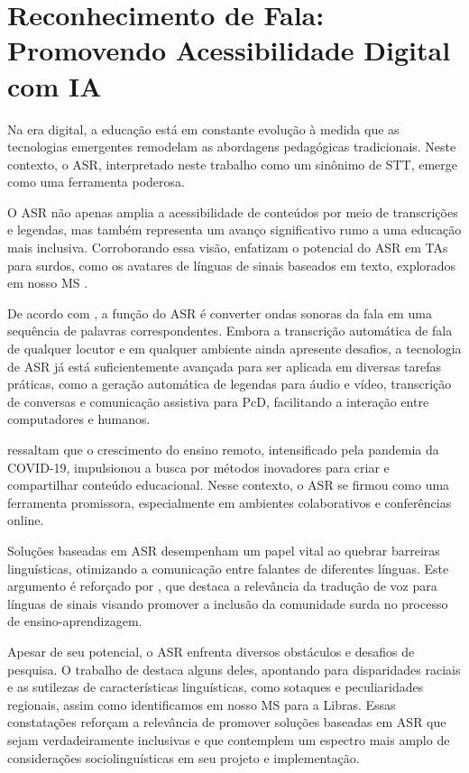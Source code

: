 \section{Reconhecimento de Fala: Promovendo Acessibilidade Digital com IA}
\label{section:foundation:asr}

Na era digital, a educação está em constante evolução à medida que as tecnologias emergentes remodelam as abordagens pedagógicas tradicionais. Neste contexto, o ASR, interpretado neste trabalho como um sinônimo de STT, emerge como uma ferramenta poderosa.

O ASR não apenas amplia a acessibilidade de conteúdos por meio de transcrições e legendas, mas também representa um avanço significativo rumo a uma educação mais inclusiva. Corroborando essa visão,  enfatizam o potencial do ASR em TAs para surdos, como os avatares de línguas de sinais baseados em texto, explorados em nosso MS \cite{FalvoJr2020_FIE, FalvoJr2020_SBIE, FalvoJr2021_RENOTE}.

De acordo com , a função do ASR é converter ondas sonoras da fala em uma sequência de palavras correspondentes. Embora a transcrição automática de fala de qualquer locutor e em qualquer ambiente ainda apresente desafios, a tecnologia de ASR já está suficientemente avançada para ser aplicada em diversas tarefas práticas, como a geração automática de legendas para áudio e vídeo, transcrição de conversas e comunicação assistiva para PcD, facilitando a interação entre computadores e humanos.

 ressaltam que o crescimento do ensino remoto, intensificado pela pandemia da COVID-19, impulsionou a busca por métodos inovadores para criar e compartilhar conteúdo educacional. Nesse contexto, o ASR se firmou como uma ferramenta promissora, especialmente em ambientes colaborativos e conferências online.

Soluções baseadas em ASR desempenham um papel vital ao quebrar barreiras linguísticas, otimizando a comunicação entre falantes de diferentes línguas. Este argumento é reforçado por , que destaca a relevância da tradução de voz para línguas de sinais visando promover a inclusão da comunidade surda no processo de ensino-aprendizagem.

Apesar de seu potencial, o ASR enfrenta diversos obstáculos e desafios de pesquisa. O trabalho de  destaca alguns deles, apontando para disparidades raciais e as sutilezas de características linguísticas, como sotaques e peculiaridades regionais, assim como identificamos em nosso MS para a Libras. Essas constatações reforçam a relevância de promover soluções baseadas em ASR que sejam verdadeiramente inclusivas e que contemplem um espectro mais amplo de considerações sociolinguísticas em seu projeto e implementação.

